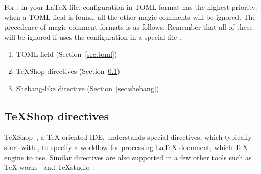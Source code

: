 \documentclass{llmk-doc}
\begin{document}
For , in your {\LaTeX} file, configuration in TOML format has the
highest priority: when a TOML field is found, all the other magic comments will
be ignored. The precedence of magic comment formats is as follows. Remember
that all of these will be ignored if  uses the configuration in a
special file .
%
\begin{enumerate}
\item TOML field (Section~\ref{sec:toml})
\item {\TeX}Shop directives (Section~\ref{sec:ts-directive})
\item Shebang-like directive (Section~\ref{sec:shebang})
\end{enumerate}

\subsection{{\TeX}Shop directives}
\label{sec:ts-directive}

{\TeX}Shop~\cite{texshop}, a {\TeX}-oriented IDE, understands special
directives, which typically start with , to
specify a workflow for processing {\LaTeX} document, \eg which {\TeX} engine to
use. Similar directives are also supported in a few other tools such as {\TeX}%
works~\cite{texworks} and {\TeX}studio~\cite{texstudio}.
\end{document}

